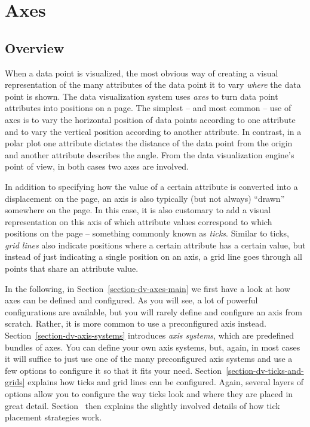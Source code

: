 %
%
%


\section{Axes}
\label{section-dv-axes}


\subsection{Overview}

When a data point is visualized, the most obvious way of creating a
visual representation of the many attributes of the data point it to
vary \emph{where} the data point is shown. The data visualization
system uses \emph{axes} to turn data point attributes into positions
on a page. The simplest -- and most common -- use of axes is to vary
the horizontal position of data points according to one attribute and
to vary the vertical position according to another attribute. In
contrast, in a polar plot one attribute dictates the distance of the
data point from the origin and another attribute describes the
angle. From the data visualization engine's point of view, in both
cases two axes are involved.

In addition to specifying how the value of a certain attribute is
converted into a displacement on the page, an axis is also typically
(but not always) ``drawn'' somewhere on the page. In this case, it is
also customary to add a visual representation on this axis of which
attribute values correspond to which positions on the page --
something commonly known as \emph{ticks}. Similar to ticks, \emph{grid
  lines} also indicate positions where a certain attribute has a
certain value, but instead of just indicating a single position on an
axis, a grid line goes through all points that share an attribute
value.

In the following, in Section~\ref{section-dv-axes-main} we first have
a look at how axes can be defined and configured. As you will see, a
lot of powerful configurations are available, but you will rarely
define and configure an axis from scratch. Rather, it is more common
to use a preconfigured axis
instead. Section~\ref{section-dv-axis-systems} introduces \emph{axis
  systems}, which are predefined bundles of axes. You can define your
own axis systems, but, again, in most cases it will suffice to just
use one of the many preconfigured axis systems and use a few options
to configure it so that it fits your
need. Section~\ref{section-dv-ticks-and-grids} explains how ticks and
grid lines can be configured. Again, several layers of
options allow you to configure the way ticks look and where they are
placed in great
detail. Section~\label{section-dv-tick-placement-strategies} then
explains the slightly involved details of how tick placement
strategies work.


